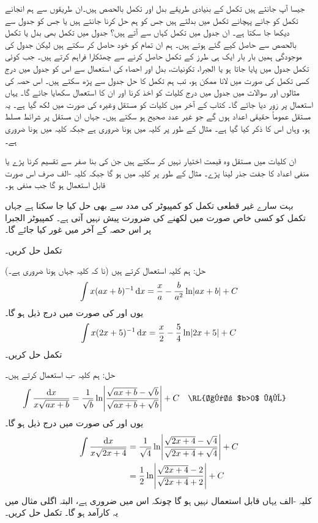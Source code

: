 جیسا آپ جانتے ہیں تکمل کے بنیادی طریقے بدل اور تکمل بالحصص ہیں۔ان طریقوں سے  ہم انجانے تکمل کو جانے پہچانے تکمل میں بدلتے ہیں جس کو ہم حل کرنا جانتے ہیں یا جس کو جدول سے دیکھا جا سکتا ہے۔ ان جدول میں تکمل کہاں سے آتے ہیں؟ جدول میں تکمل بھی بدل یا تکمل بالحصص سے حاصل کیے گئے ہوتے ہیں۔ ہم ان تمام کو خود حاصل کر سکتے ہیں لیکن جدول کی موجودگی ہمیں بار بار ایک ہی طرز کے تکمل حاصل کرنے سے چھٹکارا فراہم کرتے ہیں۔ جب کوئی تکمل جدول میں پایا جاتا ہو یا الجبرا، تکونیات، بدل اور احصاء کی استعمال سے اس کو جدول میں درج کسی تکمل کی صورت میں لانا ممکن ہو، تب ہم تکمل کا حل جدول سے پڑھ سکتے ہیں۔ اس حصہ کی مثالوں اور سوالات میں جدول میں درج کلیات کو اخذ کرنا اور ان کا استعمال سکھایا جائے گا۔ یہاں استعمال پر زور دیا جائے گا۔ کتاب کے آخر میں کلیات کو مستقل   وغیرہ کی صورت میں لکھ گیا ہے۔ یہ مستقل عموماً حقیقی اعداد ہوں گے جو غیر عدد صحیح ہو سکتے ہیں۔ جہاں ان مستقل پر شرائط مسلط ہو، وہاں اس کا ذکر کیا گیا ہے۔ مثال کے طور پر کلیہ  میں  ہونا ضروری ہے جبکہ کلیہ  میں  ہونا ضروری ہے۔ 

ان کلیات میں  مستقل وہ قیمت اختیار نہیں کر سکتے ہیں جن کی بنا صفر سے تقسیم کرنا پڑے یا منفی اعداد کا جفت جذر لینا پڑے۔ مثال کے طور پر کلیہ  میں  ہو گا جبکہ کلیہ -الف صرف اس صورت قابل استعمال ہو گا جب  منفی ہو۔ 

بہت سارے غیر قطعی تکمل کو کمپیوٹر کی مدد سے بھی حل کیا جا سکتا ہے جہاں تکمل کو کسی خاص صورت میں لکھنے کی ضرورت پیش نہیں آتی ہے۔ کمپیوٹر الجبرا پر اس حصہ کے آخر میں غور کیا جائے گا۔

تکمل  حل کریں۔

حل:\quad
ہم کلیہ  استعمال کرتے ہیں (نا کہ کلیہ  جہاں  ہونا ضروری ہے۔)
\begin{align*}
\int x(ax+b)^{-1}\dif x=\frac{x}{a}-\frac{b}{a^2}\ln\abs{ax+b}+C
\end{align*}
یوں  اور  کی صورت میں درج ذیل ہو گا۔
\begin{align*}
\int x(2x+5)^{-1}\dif x=\frac{x}{2}-\frac{5}{4}\ln\abs{2x+5}+C
\end{align*}
تکمل  حل کریں۔

حل:\quad
ہم کلیہ -ب استعمال کرتے ہیں۔
\begin{align*}
\int\frac{\dif x}{x\sqrt{ax+b}}&=\frac{1}{\sqrt{b}}\ln\abs{\frac{\sqrt{ax+b}-\sqrt{b}}{\sqrt{ax+b}+\sqrt{b}}}+C&&\text{\RL{اگر $b>0$ ہو}}
\end{align*}
یوں  اور  کی صورت میں درج ذیل ہو گا۔
\begin{align*}
\int\frac{\dif x}{x\sqrt{2x+4}}&=\frac{1}{\sqrt{4}}\ln\abs{\frac{\sqrt{2x+4}-\sqrt{4}}{\sqrt{2x+4}+\sqrt{4}}}+C\\
&=\frac{1}{2}\ln\abs{\frac{\sqrt{2x+4}-2}{\sqrt{2x+4}+2}}+C
\end{align*}
کلیہ -الف یہاں قابل استعمال نہیں ہو گا چونکہ اس میں  ضروری ہے، البتہ اگلی مثال میں یہ کارآمد ہو گا۔
تکمل  حل کریں۔

